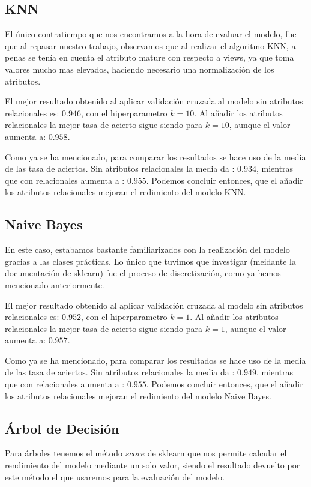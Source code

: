 \documentclass[conference,a4paper]{IEEEtran}
\begin{document}
\subsection{KNN}
El único contratiempo que nos encontramos a la hora de evaluar el modelo, fue que al repasar nuestro trabajo, observamos que al realizar el algoritmo KNN, a penas se tenía en cuenta el atributo mature con respecto a views, ya que toma valores mucho mas elevados, haciendo necesario una normalización de los atributos.

 El mejor resultado obtenido al aplicar validación cruzada al modelo sin atributos relacionales es: $0.946$, con el hiperparametro $k = 10$.  Al añadir los atributos relacionales la mejor tasa de acierto sigue siendo para $k = 10$, aunque el valor aumenta a: $0.958$.

Como ya se ha mencionado, para comparar los resultados se hace uso de la media de las tasa de aciertos. Sin atributos relacionales la media da : $0.934$, mientras que con relacionales aumenta a : $0.955$. Podemos concluir entonces, que el añadir los atributos relacionales mejoran el redimiento del modelo KNN.

\subsection{Naive Bayes}
En este caso, estabamos bastante familiarizados con la realización del modelo gracias a las clases prácticas. Lo único que tuvimos que investigar (meidante la documentación de sklearn) fue el proceso de discretización, como ya hemos mencionado anteriormente.

 El mejor resultado obtenido al aplicar validación cruzada al modelo sin atributos relacionales es: $0.952$, con el hiperparametro $k = 1$.  Al añadir los atributos relacionales la mejor tasa de acierto sigue siendo para $k = 1$, aunque el valor aumenta a: $0.957$.

Como ya se ha mencionado, para comparar los resultados se hace uso de la media de las tasa de aciertos. Sin atributos relacionales la media da : $0.949$, mientras que con relacionales aumenta a : $0.955$. Podemos concluir entonces, que el añadir los atributos relacionales mejoran el redimiento del modelo Naive Bayes.


\subsection{Árbol de Decisión}


Para árboles tenemos el método $score$ de sklearn que nos permite calcular el rendimiento del modelo mediante un solo valor, siendo el resultado devuelto por este método el que usaremos para la evaluación del modelo. 
\end{document}
